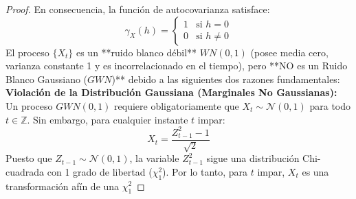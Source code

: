 \documentclass[11pt,letterpaper]{article}
\begin{document}
\begin{proof}
En consecuencia, la función de autocovarianza satisface:
\[
\gamma_X(h) = 
\begin{cases} 
1 & \text{si } h = 0 \\ 
0 & \text{si } h \neq 0 
\end{cases}
\]
El proceso $\{X_t\}$ es un **ruido blanco débil** $WN(0,1)$ (posee media cero, varianza constante 1 y es incorrelacionado en el tiempo), pero **NO es un Ruido Blanco Gaussiano ($GWN$)** debido a las siguientes dos razones fundamentales:
\textbf{Violación de la Distribución Gaussiana (Marginales No Gaussianas):}
    Un proceso $GWN(0,1)$ requiere obligatoriamente que $X_t \sim \mathcal{N}(0,1)$ para todo $t \in \mathbb{Z}$. Sin embargo, para cualquier instante $t$ impar:
    \[
    X_t = \frac{Z_{t-1}^2 - 1}{\sqrt{2}}
    \]
    Puesto que $Z_{t-1} \sim \mathcal{N}(0,1)$, la variable $Z_{t-1}^2$ sigue una distribución Chi-cuadrada con 1 grado de libertad ($\chi_1^2$). Por lo tanto, para $t$ impar, $X_t$ es una transformación afín de una $\chi_1^2$
\end{proof}
\end{document}

